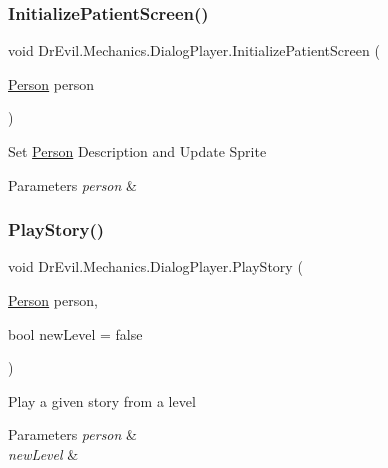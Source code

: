 \subsubsection{\texorpdfstring{Initialize\+Patient\+Screen()}{InitializePatientScreen()}}
{\footnotesize\ttfamily void Dr\+Evil.\+Mechanics.\+Dialog\+Player.\+Initialize\+Patient\+Screen (\begin{DoxyParamCaption}\item[{\mbox{\hyperlink{class_person}{Person}}}]{person }\end{DoxyParamCaption})\hspace{0.3cm}{\ttfamily [inline]}}



Set \mbox{\hyperlink{class_person}{Person}} Description and Update Sprite 


\begin{DoxyParams}{Parameters}
{\em person} & \\
\hline
\end{DoxyParams}
\mbox{\label{class_dr_evil_1_1_mechanics_1_1_dialog_player_a1d412965461502a4770f7c754f5188f0}} 
\subsubsection{\texorpdfstring{Play\+Story()}{PlayStory()}}
{\footnotesize\ttfamily void Dr\+Evil.\+Mechanics.\+Dialog\+Player.\+Play\+Story (\begin{DoxyParamCaption}\item[{\mbox{\hyperlink{class_person}{Person}}}]{person,  }\item[{bool}]{new\+Level = {\ttfamily false} }\end{DoxyParamCaption})\hspace{0.3cm}{\ttfamily [inline]}}



Play a given story from a level 


\begin{DoxyParams}{Parameters}
{\em person} & \\
\hline
{\em new\+Level} & \\
\hline
\end{DoxyParams}
\mbox{\label{class_dr_evil_1_1_mechanics_1_1_dialog_player_a38669bb0c15607e64dca7741052f9c6e}} 
